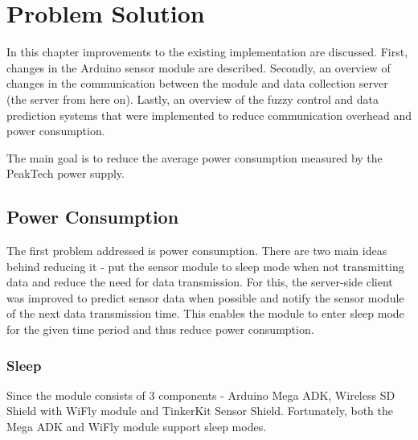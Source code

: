 
\chapter{Problem Solution} %

In this chapter improvements to the existing implementation are discussed. First, changes in the Arduino sensor module are described. Secondly, an overview of changes in the communication between the module and data collection server (the server from here on). Lastly, an overview of the fuzzy control and data prediction systems that were implemented to reduce communication overhead and power consumption.

The main goal is to reduce the average power consumption measured by  the PeakTech power supply. 



\ifpdf
    \graphicspath{{X/figures/PNG/}{X/figures/PDF/}{X/figures/}}
\else
    \graphicspath{{X/figures/EPS/}{X/figures/}}
\fi


\section{Power Consumption}

The first problem addressed is power consumption. There are two main ideas behind reducing it - put the sensor module to sleep mode when not transmitting data and reduce the need for data transmission. For this, the server-side client was improved to predict sensor data when possible and notify the sensor module of the next data transmission time. This enables the module to enter sleep mode for the given time period and thus reduce power consumption. 

\subsection{Sleep}

Since the module consists of 3 components - Arduino Mega ADK, Wireless SD Shield with WiFly module and TinkerKit Sensor Shield. Fortunately, both the Mega ADK and WiFly module support sleep modes. 

